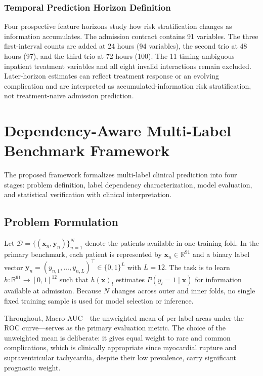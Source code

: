 \documentclass{ieeeaccess}
\begin{document}
\subsubsection{Temporal Prediction Horizon Definition}

Four prospective feature horizons study how risk stratification changes as information accumulates. The admission contract contains 91 variables. The three first-interval counts are added at 24 hours (94 variables), the second trio at 48 hours (97), and the third trio at 72 hours (100). The 11 timing-ambiguous inpatient treatment variables and all eight invalid interactions remain excluded. Later-horizon estimates can reflect treatment response or an evolving complication and are interpreted as accumulated-information risk stratification, not treatment-naive admission prediction.

\section{Dependency-Aware Multi-Label Benchmark Framework}
\label{sec:framework}

The proposed framework formalizes multi-label clinical prediction into four stages: problem definition, label dependency characterization, model evaluation, and statistical verification with clinical interpretation.

\subsection{Problem Formulation}

Let $\mathcal{D} = \{(\mathbf{x}_n, \mathbf{y}_n)\}_{n=1}^{N}$ denote the patients available in one training fold. In the primary benchmark, each patient is represented by $\mathbf{x}_n \in \mathbb{R}^{91}$ and a binary label vector $\mathbf{y}_n = (y_{n,1}, \ldots, y_{n,L})^\top \in \{0, 1\}^{L}$ with $L = 12$. The task is to learn $h: \mathbb{R}^{91} \to [0, 1]^{12}$ such that $h(\mathbf{x})_l$ estimates $P(y_l = 1 \mid \mathbf{x})$ for information available at admission. Because $N$ changes across outer and inner folds, no single fixed training sample is used for model selection or inference.

Throughout, Macro-AUC—the unweighted mean of per-label areas under the ROC curve—serves as the primary evaluation metric. The choice of the unweighted mean is deliberate: it gives equal weight to rare and common complications, which is clinically appropriate since myocardial rupture and supraventricular tachycardia, despite their low prevalence, carry significant prognostic weight.
\end{document}
